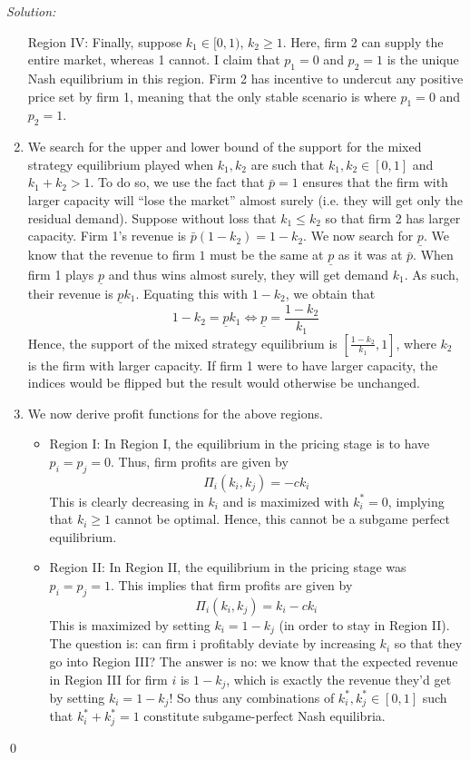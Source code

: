 \documentclass[12pt]{article}
\newenvironment{sol}
    {\emph{Solution:}
    }
    {
    \qed
    }
\begin{document}
\begin{sol}
\begin{enumerate}[label=\alph*) ]
    Region IV: Finally, suppose $k_1 \in [0,1)$, $k_2 \geq 1$. Here, firm 2 can supply the entire market, whereas 1 cannot. I claim that $p_1 = 0$ and $p_2 = 1$ is the unique Nash equilibrium in this region. Firm 2 has incentive to undercut any positive price set by firm 1, meaning that the only stable scenario is where $p_1 = 0$ and $p_2 = 1$.
    \item We search for the upper and lower bound of the support for the mixed strategy equilibrium played when $k_1, k_2$ are such that $k_1, k_2 \in [0,1]$ and $k_1 + k_2 > 1$. To do so, we use the fact that $\bar{p} = 1$ ensures that the firm with larger capacity will ``lose the market'' almost surely (i.e. they will get only the residual demand). Suppose without loss that $k_1 \leq k_2$ so that firm 2 has larger capacity. Firm 1's revenue is $ \bar{p} (1-k_2) = 1-k_2$. We now search for $\underline{p}$. We know that the revenue to firm $1$ must be the same at $\underline{p}$ as it was at $\bar{p}$. When firm 1 plays $\underline{p}$ and thus wins almost surely, they will get demand $k_1$. As such, their revenue is $\underline{p} k_1$. Equating this with $1-k_2$, we obtain that
     \[1 - k_2 = \underline{p} k_1 \iff \underline{p} = \frac{1-k_2}{k_1}\]
     Hence, the support of the mixed strategy equilibrium is $\left[\frac{1-k_2}{k_1}, 1\right]$, where $k_2$ is the firm with larger capacity. If firm 1 were to have larger capacity, the indices would be flipped but the result would otherwise be unchanged.
     \item We now derive profit functions for the above regions. 
     \begin{itemize}
        \item Region I: In Region I, the equilibrium in the pricing stage is to have $p_i = p_j = 0$. Thus, firm profits are given by 
        \[\Pi_i(k_i, k_j) = - c k_i\]
        This is clearly decreasing in $k_i$ and is maximized with $k_i^* = 0$, implying that $k_i \geq 1$ cannot be optimal. Hence, this cannot be a subgame perfect equilibrium.
        \item Region II: In Region II, the equilibrium in the pricing stage was $p_i = p_j = 1$. This implies that firm profits are given by
         \[\Pi_i (k_i, k_j) = k_i - c k_i\]
         This is maximized by setting $k_i = 1- k_j$ (in order to stay in Region II). The question is: can firm i profitably deviate by increasing $k_i$ so that they go into Region III? The answer is no: we know that the expected revenue in Region III for firm $i$ is $1-k_j$, which is exactly the revenue they'd get by setting $k_i = 1- k_j$! So thus any combinations of $k_i^*, k_j^* \in [0,1]$ such that $k_i^* + k_j^* = 1$ constitute subgame-perfect Nash equilibria.

\end{itemize}
\end{enumerate}
\end{sol}
\end{document}
